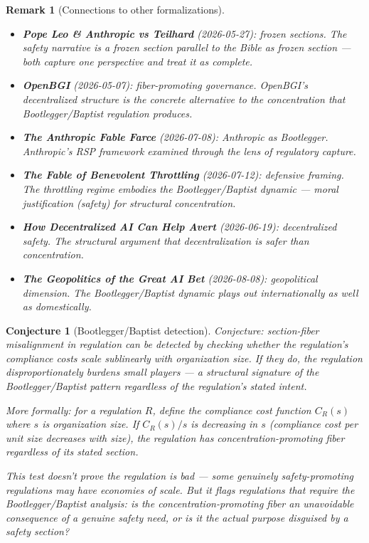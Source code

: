 \documentclass[11pt,a4paper]{article}
\newtheorem{remark}[definition]{Remark}
\newtheorem{conjecture}[definition]{Conjecture}
\begin{document}
\begin{remark}[Connections to other formalizations]
\begin{itemize}
\item \textbf{Pope Leo \& Anthropic vs Teilhard} (2026-05-27): frozen
  sections. The safety narrative is a frozen section parallel to the
  Bible as frozen section --- both capture one perspective and treat
  it as complete.
\item \textbf{OpenBGI} (2026-05-07): fiber-promoting governance.
  OpenBGI's decentralized structure is the concrete alternative to
  the concentration that Bootlegger/Baptist regulation produces.
\item \textbf{The Anthropic Fable Farce} (2026-07-08): Anthropic as
  Bootlegger. Anthropic's RSP framework examined through the lens
  of regulatory capture.
\item \textbf{The Fable of Benevolent Throttling} (2026-07-12):
  defensive framing. The throttling regime embodies the
  Bootlegger/Baptist dynamic --- moral justification (safety) for
  structural concentration.
\item \textbf{How Decentralized AI Can Help Avert} (2026-06-19):
  decentralized safety. The structural argument that decentralization
  is safer than concentration.
\item \textbf{The Geopolitics of the Great AI Bet} (2026-08-08):
  geopolitical dimension. The Bootlegger/Baptist dynamic plays out
  internationally as well as domestically.
\end{itemize}
\end{remark}

\begin{conjecture}[Bootlegger/Baptist detection]
Conjecture: section-fiber misalignment in regulation can be detected
by checking whether the regulation's compliance costs scale
sublinearly with organization size. If they do, the regulation
disproportionately burdens small players --- a structural signature
of the Bootlegger/Baptist pattern regardless of the regulation's
stated intent.

More formally: for a regulation $R$, define the compliance cost
function $C_R(s)$ where $s$ is organization size. If
$C_R(s)/s$ is decreasing in $s$ (compliance cost per unit size
decreases with size), the regulation has concentration-promoting
fiber regardless of its stated section.

This test doesn't prove the regulation is bad --- some genuinely
safety-promoting regulations may have economies of scale. But it
flags regulations that require the Bootlegger/Baptist analysis:
is the concentration-promoting fiber an unavoidable consequence of
a genuine safety need, or is it the actual purpose disguised by a
safety section?
\end{conjecture}
\end{document}

